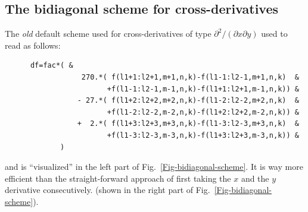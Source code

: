 \documentclass[\mydriver,12pt,twoside,notitlepage,a4paper]{article}
\begin{document}
\subsection{The bidiagonal scheme for cross-derivatives}
\label{Bidiagonal}

The {\em old} default scheme used for cross-derivatives of type
$\partial^2/(\partial x \partial y)$ used to read as follows:
\begin{verbatim}
      df=fac*( &
                  270.*( f(l1+1:l2+1,m+1,n,k)-f(l1-1:l2-1,m+1,n,k)  &
                        +f(l1-1:l2-1,m-1,n,k)-f(l1+1:l2+1,m-1,n,k)) &
                 - 27.*( f(l1+2:l2+2,m+2,n,k)-f(l1-2:l2-2,m+2,n,k)  &
                        +f(l1-2:l2-2,m-2,n,k)-f(l1+2:l2+2,m-2,n,k)) &
                 +  2.*( f(l1+3:l2+3,m+3,n,k)-f(l1-3:l2-3,m+3,n,k)  &
                        +f(l1-3:l2-3,m-3,n,k)-f(l1+3:l2+3,m-3,n,k)) &
             )
\end{verbatim}
and is ``visualized'' in the left part of Fig.~\ref{Fig-bidiagonal-scheme}.
It is way more efficient than the straight-forward approach of first
taking the $x$ and the $y$ derivative consecutively.
(shown in the right part of Fig.~\ref{Fig-bidiagonal-scheme}).
\end{document}
